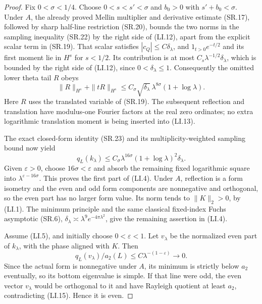 \begin{proof}
Fix \(0<\sigma<1/4\).  Choose \(0<s<s'<\sigma\) and
\(b_0>0\) with \(s'+b_0<\sigma\).  Under \(A\), the already
proved Mellin multiplier and derivative estimate (SR.17), followed
by sharp half-line restriction (SR.20), bounds the two norms in
the sampling inequality (SR.22) by the right side of (LI.12),
apart from the explicit scalar term in (SR.19).
That scalar satisfies \(|c_Q|\le C\delta_\lambda\), and
\(1_{t>0}e^{-t/2}\) and its first moment lie in \(H^s\) for
\(s<1/2\).  Its contribution is at most
\(C_s\lambda^{-1/2}\delta_\lambda\), which is bounded by the
right side of (LI.12), since \(0<\delta_\lambda\le1\).
Consequently the omitted lower theta tail \(R\) obeys
\[
 \|R\|_{H^s}+\|tR\|_{H^s}
      \le C_\sigma\sqrt{\delta_\lambda}\,
                       \lambda^{8\sigma}(1+\log\lambda).
 \tag{LI.13}
\]
Here \(R\) uses the translated variable of (SR.19).
The subsequent reflection and translation have modulus-one Fourier
factors at the real zero ordinates; no extra logarithmic translation
moment is being inserted into (LI.13).

The exact closed-form identity (SR.23) and its multiplicity-weighted
sampling bound now yield
\[
 q_L(k_\lambda)
       \le C_\sigma\lambda^{16\sigma}
                    (1+\log\lambda)^2\delta_\lambda.
 \tag{LI.14}
\]
Given \(\varepsilon>0\), choose \(16\sigma<\varepsilon\) and
absorb the remaining fixed logarithmic square into
\(\lambda^{\varepsilon-16\sigma}\).  This proves the first part
of (LI.4).  Under \(A\), reflection is a form isometry and the
even and odd form components are nonnegative and orthogonal, so
the even part has no larger form value.  Its norm tends to
\(\|K\|_2>0\), by (LI.1).
The minimum principle and the same classical fixed-index Fuchs
asymptotic (SR.6),
\(\delta_\lambda\asymp\lambda^9e^{-4\pi\lambda^2}\), give
the remaining assertion in (LI.4).

Assume (LI.5), and initially choose \(0<\varepsilon<1\).
Let \(v_\lambda\) be the normalized even part of \(k_\lambda\),
with the phase aligned with \(K\).  Then
\[
  q_L(v_\lambda)/a_2(L)
        \le C\lambda^{-(1-\varepsilon)}
                 \longrightarrow0.
  \tag{LI.15}
\]
Since the actual form is nonnegative under \(A\), its minimum is
strictly below \(a_2\) eventually, so its bottom eigenvalue is
simple.  If that line were odd, the even vector \(v_\lambda\)
would be orthogonal to it and have Rayleigh quotient at least
\(a_2\), contradicting (LI.15).  Hence it is even.


\end{proof}
